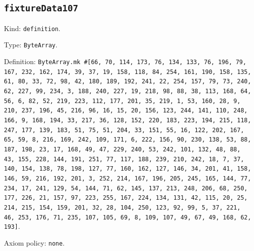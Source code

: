 \documentclass[11pt]{article}
\begin{document}
\subsection*{\texttt{fixtureData107}}
\noindent Kind: \texttt{definition}.\par
\noindent Type: \texttt{ByteArray}.\par
\noindent Definition: \texttt{ByteArray.mk \#[66, 70, 114, 173, 76, 134, 133, 76, 196, 79, 167, 232, 162, 174, 39, 37, 19, 158, 118, 84, 254, 161, 190, 158, 135, 61, 80, 33, 72, 98, 42, 180, 189, 192, 241, 22, 254, 157, 79, 73, 240, 62, 227, 99, 234, 3, 188, 240, 227, 19, 218, 98, 88, 38, 113, 168, 64, 56, 6, 82, 52, 219, 223, 112, 177, 201, 35, 219, 1, 53, 160, 28, 9, 210, 237, 196, 45, 216, 96, 16, 15, 20, 156, 123, 244, 141, 110, 248, 166, 9, 168, 194, 33, 217, 36, 128, 152, 220, 183, 223, 194, 215, 118, 247, 177, 139, 183, 51, 75, 51, 204, 33, 151, 55, 16, 122, 202, 167, 65, 59, 8, 216, 169, 242, 109, 171, 6, 222, 156, 90, 230, 138, 53, 88, 187, 198, 23, 17, 168, 49, 47, 229, 240, 53, 242, 101, 132, 48, 88, 43, 155, 228, 144, 191, 251, 77, 117, 188, 239, 210, 242, 18, 7, 37, 140, 154, 138, 78, 198, 127, 77, 160, 162, 127, 146, 34, 201, 41, 158, 146, 59, 216, 192, 201, 3, 252, 214, 167, 196, 205, 245, 165, 144, 77, 234, 17, 241, 129, 54, 144, 71, 62, 145, 137, 213, 248, 206, 68, 250, 177, 226, 21, 157, 97, 223, 255, 167, 224, 134, 131, 42, 115, 20, 25, 214, 215, 154, 159, 201, 32, 28, 104, 250, 123, 92, 99, 5, 37, 221, 46, 253, 176, 71, 235, 107, 105, 69, 8, 109, 107, 49, 67, 49, 168, 62, 193]}.\par
\noindent Axiom policy: \texttt{none}.\par
\end{document}
